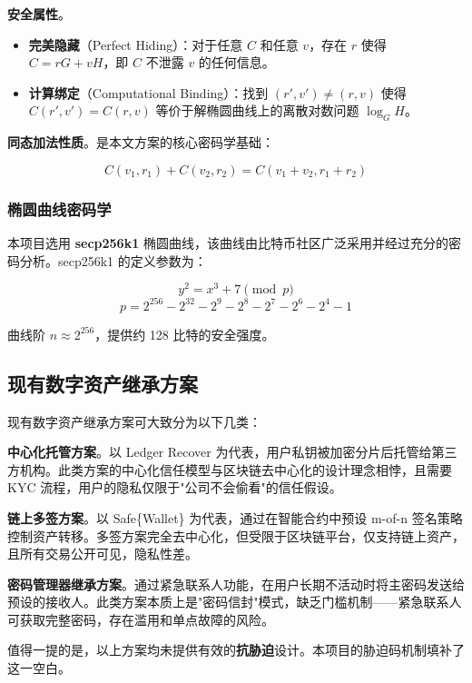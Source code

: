\vspace{0.5em}
\noindent \textbf{安全属性}。

\begin{itemize}
    \item \textbf{完美隐藏}（Perfect Hiding）：对于任意 $C$ 和任意 $v$，存在 $r$ 使得 $C = rG + vH$，即 $C$ 不泄露 $v$ 的任何信息。
    \item \textbf{计算绑定}（Computational Binding）：找到 $(r', v') \neq (r, v)$ 使得 $C(r', v') = C(r, v)$ 等价于解椭圆曲线上的离散对数问题 $\log_G H$。
\end{itemize}

\vspace{0.5em}
\noindent \textbf{同态加法性质}。是本文方案的核心密码学基础：

\[
C(v_1, r_1) + C(v_2, r_2) = C(v_1 + v_2, r_1 + r_2)
\]

\subsubsection{椭圆曲线密码学}

本项目选用 \textbf{secp256k1} 椭圆曲线，该曲线由比特币社区广泛采用并经过充分的密码分析。secp256k1 的定义参数为：

\[
y^2 = x^3 + 7 \pmod{p}
\]
\[
p = 2^{256} - 2^{32} - 2^9 - 2^8 - 2^7 - 2^6 - 2^4 - 1
\]

曲线阶 $n \approx 2^{256}$，提供约 128 比特的安全强度。

\subsection{现有数字资产继承方案}

现有数字资产继承方案可大致分为以下几类：

\textbf{中心化托管方案}。以 Ledger Recover 为代表，用户私钥被加密分片后托管给第三方机构。此类方案的中心化信任模型与区块链去中心化的设计理念相悖，且需要 KYC 流程，用户的隐私仅限于"公司不会偷看"的信任假设。

\textbf{链上多签方案}。以 Safe\{Wallet\} 为代表，通过在智能合约中预设 m-of-n 签名策略控制资产转移。多签方案完全去中心化，但受限于区块链平台，仅支持链上资产，且所有交易公开可见，隐私性差。

\textbf{密码管理器继承方案}。通过紧急联系人功能，在用户长期不活动时将主密码发送给预设的接收人。此类方案本质上是"密码信封"模式，缺乏门槛机制——紧急联系人可获取完整密码，存在滥用和单点故障的风险。

值得一提的是，以上方案均未提供有效的\textbf{抗胁迫}设计。本项目的胁迫码机制填补了这一空白。


